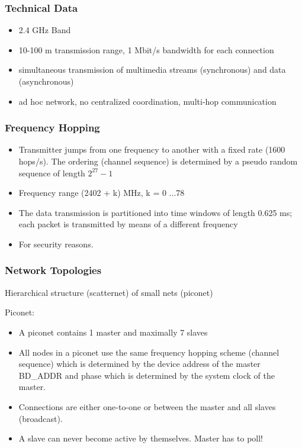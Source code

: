 \subsubsection{Technical Data}
\begin{itemize}[noitemsep]
\item 2.4 GHz Band
\item 10-100 m transmission range, 1 Mbit/s bandwidth for each connection
\item simultaneous transmission of multimedia streams (synchronous) and data (asynchronous)
\item ad hoc network, no centralized coordination, multi-hop communication
\end{itemize}


\subsubsection{Frequency Hopping}
\begin{itemize}[noitemsep]
\item Transmitter jumps from one frequency to another with a fixed rate (1600 hops/s). The ordering (channel sequence) is determined by a pseudo random sequence of length $2^{27}-1$
\item Frequency range (2402 + k) MHz, k = 0 ...78
\item The data transmission is partitioned into time windows of length 0.625  ms; each packet is transmitted by means of a different frequency
\item For security reasons.
\end{itemize}

\subsubsection{Network Topologies}
Hierarchical structure (scatternet) of small nets (piconet)


Piconet:
\begin{itemize}[noitemsep]
\item A piconet contains 1 master and maximally 7 slaves
\item All nodes in a piconet use the same frequency hopping scheme (channel sequence) which is determined by the device address of the master BD\_ADDR and phase which is determined by the system clock of the master.
\item Connections are either one-to-one or between the master and all slaves (broadcast).
\item A slave can never become active by themselves. Master has to poll!
\end{itemize}

